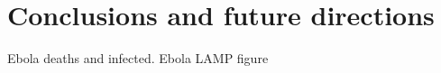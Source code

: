 \documentclass[../sherrill-Mix_thesis.tex]{subfiles}
\begin{document}
\graphicspath{{im/}{conclusions/im/}}
\chapter{Conclusions and future directions}



Ebola deaths and infected.  Ebola LAMP figure
\end{document}
